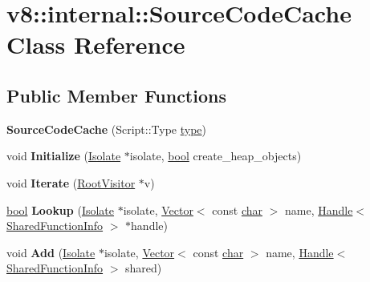 \hypertarget{classv8_1_1internal_1_1SourceCodeCache}{}\section{v8\+:\+:internal\+:\+:Source\+Code\+Cache Class Reference}
\label{classv8_1_1internal_1_1SourceCodeCache}
\subsection*{Public Member Functions}
\begin{DoxyCompactItemize}
\item 
\mbox{\label{classv8_1_1internal_1_1SourceCodeCache_a5a3752d35960ed6bfec2a395d6ca8aea}} 
{\bfseries Source\+Code\+Cache} (Script\+::\+Type \mbox{\hyperlink{classstd_1_1conditional_1_1type}{type}})
\item 
\mbox{\label{classv8_1_1internal_1_1SourceCodeCache_aac40c73c86a47f96a3b62316691b8fe1}} 
void {\bfseries Initialize} (\mbox{\hyperlink{classv8_1_1internal_1_1Isolate}{Isolate}} $\ast$isolate, \mbox{\hyperlink{classbool}{bool}} create\+\_\+heap\+\_\+objects)
\item 
\mbox{\label{classv8_1_1internal_1_1SourceCodeCache_ab32e7cebab48ba24191cc1e76d5c6624}} 
void {\bfseries Iterate} (\mbox{\hyperlink{classv8_1_1internal_1_1RootVisitor}{Root\+Visitor}} $\ast$v)
\item 
\mbox{\label{classv8_1_1internal_1_1SourceCodeCache_a995e27ba9aea736445db148709ec002d}} 
\mbox{\hyperlink{classbool}{bool}} {\bfseries Lookup} (\mbox{\hyperlink{classv8_1_1internal_1_1Isolate}{Isolate}} $\ast$isolate, \mbox{\hyperlink{classv8_1_1internal_1_1Vector}{Vector}}$<$ const \mbox{\hyperlink{classchar}{char}} $>$ name, \mbox{\hyperlink{classv8_1_1internal_1_1Handle}{Handle}}$<$ \mbox{\hyperlink{classv8_1_1internal_1_1SharedFunctionInfo}{Shared\+Function\+Info}} $>$ $\ast$handle)
\item 
\mbox{\label{classv8_1_1internal_1_1SourceCodeCache_a538619d962a07cfbb92d568197ae53fa}} 
void {\bfseries Add} (\mbox{\hyperlink{classv8_1_1internal_1_1Isolate}{Isolate}} $\ast$isolate, \mbox{\hyperlink{classv8_1_1internal_1_1Vector}{Vector}}$<$ const \mbox{\hyperlink{classchar}{char}} $>$ name, \mbox{\hyperlink{classv8_1_1internal_1_1Handle}{Handle}}$<$ \mbox{\hyperlink{classv8_1_1internal_1_1SharedFunctionInfo}{Shared\+Function\+Info}} $>$ shared)
\end{DoxyCompactItemize}



